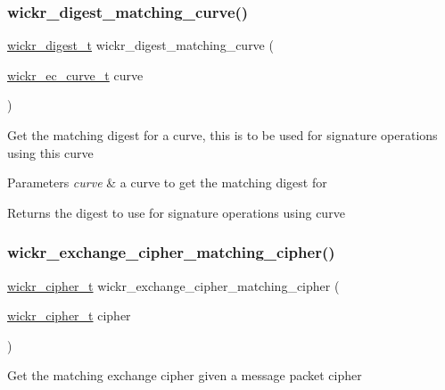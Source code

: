 \subsubsection{\texorpdfstring{wickr\+\_\+digest\+\_\+matching\+\_\+curve()}{wickr\_digest\_matching\_curve()}}
{\footnotesize\ttfamily \mbox{\hyperlink{structwickr__digest}{wickr\+\_\+digest\+\_\+t}} wickr\+\_\+digest\+\_\+matching\+\_\+curve (\begin{DoxyParamCaption}\item[{\mbox{\hyperlink{structwickr__ec__curve}{wickr\+\_\+ec\+\_\+curve\+\_\+t}}}]{curve }\end{DoxyParamCaption})}

Get the matching digest for a curve, this is to be used for signature operations using this curve


\begin{DoxyParams}{Parameters}
{\em curve} & a curve to get the matching digest for \\
\hline
\end{DoxyParams}
\begin{DoxyReturn}{Returns}
the digest to use for signature operations using \textquotesingle{}curve\textquotesingle{} 
\end{DoxyReturn}
\mbox{\label{group__wickr__crypto__engine_gaf44e3be9066727bf83034d3593dc74e2}} 
\subsubsection{\texorpdfstring{wickr\+\_\+exchange\+\_\+cipher\+\_\+matching\+\_\+cipher()}{wickr\_exchange\_cipher\_matching\_cipher()}}
{\footnotesize\ttfamily \mbox{\hyperlink{structwickr__cipher}{wickr\+\_\+cipher\+\_\+t}} wickr\+\_\+exchange\+\_\+cipher\+\_\+matching\+\_\+cipher (\begin{DoxyParamCaption}\item[{\mbox{\hyperlink{structwickr__cipher}{wickr\+\_\+cipher\+\_\+t}}}]{cipher }\end{DoxyParamCaption})}

Get the matching exchange cipher given a message packet cipher

